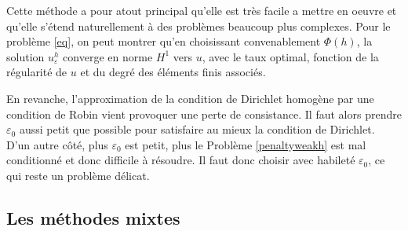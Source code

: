 \documentclass[11pt]{book}
\newcommand{\eps}{\varepsilon}
\begin{document}
Cette méthode a pour atout principal qu'elle est très facile a mettre en oeuvre et qu'elle s'étend naturellement à des problèmes beaucoup plus complexes. Pour le problème \eqref{eq}, on peut montrer qu'en choisissant convenablement $\Phi(h)$, la solution $u^h_\eps$ converge en norme $H^1$ vers $u$, avec le taux optimal, fonction de la régularité de $u$ et du degré des éléments finis associés. 

En revanche, l'approximation de la condition de Dirichlet homogène par une condition de Robin vient provoquer une perte de consistance. Il faut alors prendre $\eps_0$ aussi petit que possible pour satisfaire au mieux la condition de Dirichlet. D'un autre côté, plus $\eps_0$ est petit, plus le Problème \eqref{penaltyweakh} est mal conditionné et donc difficile à résoudre. Il faut donc choisir avec habileté $\eps_0$, ce qui reste un problème délicat.

\subsection{Les méthodes mixtes}
\end{document}
